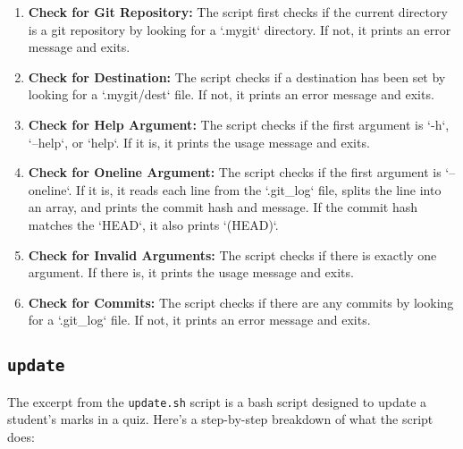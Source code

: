 \documentclass{article}
\begin{document}
\begin{enumerate}
    \item \textbf{Check for Git Repository:} The script first checks if the current directory is a git repository by looking for a `.mygit` directory. If not, it prints an error message and exits.
    
    \item \textbf{Check for Destination:} The script checks if a destination has been set by looking for a `.mygit/dest` file. If not, it prints an error message and exits.
    
    \item \textbf{Check for Help Argument:} The script checks if the first argument is `-h`, `--help`, or `help`. If it is, it prints the usage message and exits.
    
    \item \textbf{Check for Oneline Argument:} The script checks if the first argument is `--oneline`. If it is, it reads each line from the `.git\_log` file, splits the line into an array, and prints the commit hash and message. If the commit hash matches the `HEAD`, it also prints `(HEAD)`.
    
    \item \textbf{Check for Invalid Arguments:} The script checks if there is exactly one argument. If there is, it prints the usage message and exits.
    
    \item \textbf{Check for Commits:} The script checks if there are any commits by looking for a `.git\_log` file. If not, it prints an error message and exits.
\end{enumerate}

\subsection{\texttt{update}}
The excerpt from the \texttt{update.sh} script is a bash script designed to update a student's marks in a quiz. Here's a step-by-step breakdown of what the script does:
\end{document}
